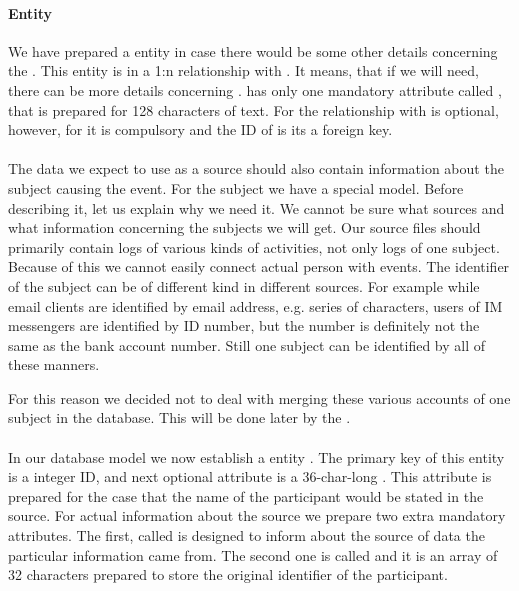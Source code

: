 \paragraph{Entity }
We have prepared a entity  in case there would be some other details concerning the . This entity is in a 1:n relationship with . It means, that if we will need, there can be more details concerning .  has only one mandatory attribute called , that is prepared for 128 characters of text. For  the relationship with  is optional, however, for  it is compulsory and the ID of  is its a foreign key. 

\paragraph{}
The data we expect to use as a source should also contain information about the subject causing the event. For the subject we have a special model. Before describing it, let us explain why we need it. We cannot be sure what sources and what information concerning the subjects we will get. Our source files should primarily contain logs of various kinds of activities, not only logs of one subject. Because of this we cannot easily connect actual person with events. The identifier of the subject can be of different kind in different sources. For example while email clients are identified by email address, e.g. series of characters, users of IM messengers are identified by ID number, but the number is definitely not the same as the bank account number. Still one subject can be identified by all of these manners. 

For this reason we decided not to deal with merging these various accounts of one subject in the database. This will be done later by the . 

\paragraph{}
In our database model we now establish a entity . The primary key of this entity is a integer ID, and next optional attribute is a 36-char-long . This attribute is prepared for the case that the name of the participant would be stated in the source. For actual information about the source we prepare two extra mandatory attributes. The first, called  is designed to inform about the source of data the particular information came from. The second one is called  and it is an array of 32 characters prepared to store the original identifier of the participant.

